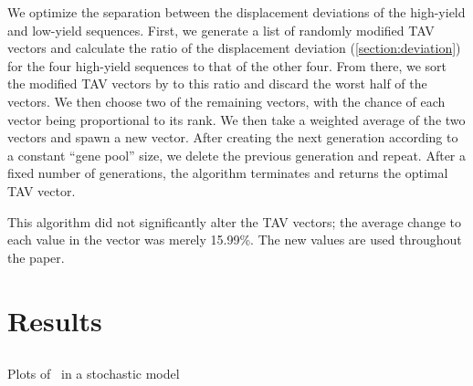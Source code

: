 \documentclass[12pt]{article}
\begin{document}
We optimize the separation between the displacement deviations of the 
high-yield and low-yield sequences. First, we generate a list of 
randomly modified TAV vectors and calculate the ratio of the 
displacement deviation (\autoref{section:deviation}) for the four 
high-yield sequences to that of the other four. From there, we sort the 
modified TAV vectors by to this ratio and discard the worst half of the 
vectors. We then choose two of the remaining vectors, with the chance 
of each vector being proportional to its rank.  We then take a weighted 
average of the two vectors and spawn a new vector.  After creating the 
next generation according to a constant ``gene pool'' size, we delete 
the previous generation  and repeat. After a fixed number of 
generations, the algorithm terminates and returns the optimal TAV vector.

This algorithm did not significantly alter the TAV vectors; the average 
change to each value in the vector was merely 15.99\%.  The new values
are used throughout the paper.

\section{Results}
\subsection{\prfB}

\begin{cfigure}
  \caption{Plots of \prfB\ in a stochastic model}
  \label{prfB:stochplots}
\end{cfigure}
\end{document}
